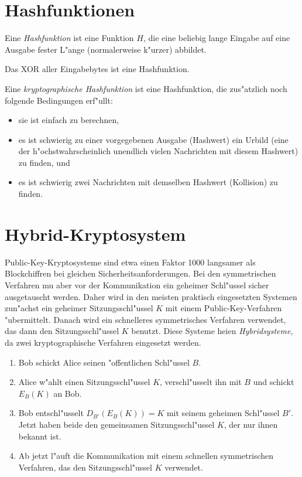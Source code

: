 \section{Hashfunktionen}

\begin{definition}[Hashfunktion]
Eine {\em Hashfunktion} ist eine Funktion $H$, die eine beliebig lange Eingabe 
auf eine Ausgabe fester L"ange (normalerweise k"urzer) abbildet. 
\end{definition}

\begin{beispiel} 
Das XOR aller Eingabebytes ist eine Hashfunktion.
\end{beispiel}

\begin{definition}
  Eine {\em kryptographische Hashfunktion} ist eine Hashfunktion, die
  zus"atzlich noch folgende Bedingungen erf"ullt:
  \begin{itemize}
    \item sie ist einfach zu berechnen,
    \item es ist schwierig zu einer vorgegebenen Ausgabe (Hashwert)
      ein Urbild (eine der h"ochstwahrscheinlich unendlich vielen
      Nachrichten mit diesem Hashwert) zu finden, und 
    \item es ist schwierig zwei Nachrichten mit demselben Hashwert 
      (Kollision) zu finden.
  \end{itemize}
\end{definition}

\section{Hybrid-Kryptosystem}

Public-Key-Kryptosysteme sind etwa einen Faktor 1000 langsamer als
Blockchiffren bei gleichen Sicherheitsanforderungen. Bei den symmetrischen 
Verfahren mu\3 aber vor der Kommunikation ein geheimer Schl"ussel sicher
ausgetauscht werden. Daher wird in den meisten praktisch eingesetzten
Systemen zun"achst ein geheimer Sitzungsschl"ussel $K$ mit einem
Public-Key-Verfahren "ubermittelt. Danach wird ein schnelleres
symmetrisches Verfahren verwendet, das dann den Sitzungsschl"ussel $K$
benutzt. Diese Systeme hei\3en {\em Hybridsysteme}, da zwei
kryptographische Verfahren eingesetzt werden.
\begin{enumerate}
  \item Bob schickt Alice seinen "offentlichen Schl"ussel $B$.
  \item Alice w"ahlt einen Sitzungsschl"ussel $K$, verschl"usselt ihn
         mit $B$ und schickt $E_B(K)$ an Bob.
  \item Bob entschl"usselt $D_{B'}(E_B(K))=K$ mit seinem geheimen
        Schl"ussel $B'$. Jetzt haben beide den gemeinsamen
        Sitzungsschl"ussel $K$, der nur ihnen bekannt ist.
  \item Ab jetzt l"auft die Kommunikation mit einem schnellen
        symmetrischen Verfahren, das den Sitzungsschl"ussel $K$
        verwendet.
\end{enumerate}


